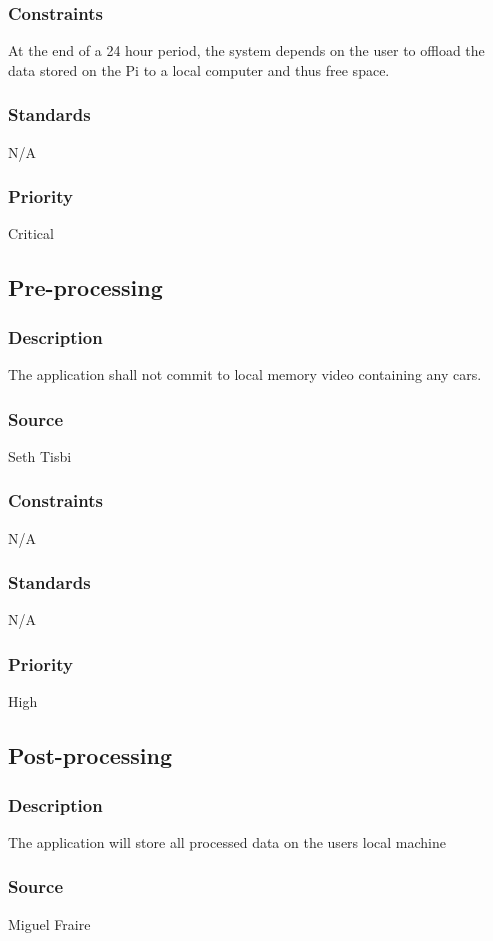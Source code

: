 \subsubsection{Constraints}
At the end of a 24 hour period, the system depends on the user to offload the data stored on the Pi to a local computer and thus free space.
\subsubsection{Standards}
N/A
\subsubsection{Priority}
Critical

\subsection{Pre-processing}
\subsubsection{Description}
The application shall not commit to local memory video containing any cars.
\subsubsection{Source}
Seth Tisbi
\subsubsection{Constraints}
N/A
\subsubsection{Standards}
N/A
\subsubsection{Priority}
High

\subsection{Post-processing}
\subsubsection{Description}
The application will store all processed data on the users local machine
\subsubsection{Source}
Miguel Fraire
